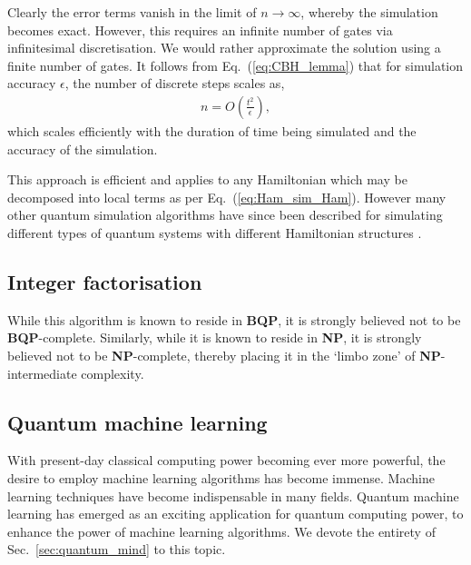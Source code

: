 Clearly the error terms vanish in the limit of \mbox{$n\to\infty$}, whereby the simulation becomes exact. However, this requires an infinite number of gates via infinitesimal discretisation. We would rather approximate the solution using a finite number of gates. It follows from Eq.~(\ref{eq:CBH_lemma}) that for simulation accuracy $\epsilon$, the number of discrete steps scales as,
\begin{align}
n = O\left(\frac{t^2}{\epsilon}\right),
\end{align}
which scales efficiently with the duration of time being simulated and the accuracy of the simulation.

This approach is efficient and applies to any Hamiltonian which may be decomposed into local terms as per Eq.~(\ref{eq:Ham_sim_Ham}). However many other quantum simulation algorithms have since been described for simulating different types of quantum systems with different Hamiltonian structures \cite{bib:JLP, bib:BrennenWavelets}.

%
%

\subsection{Integer factorisation} \label{sec:shors_alg}



While this algorithm is known to reside in \textbf{BQP}, it is strongly believed not to be \textbf{BQP}-complete. Similarly, while it is known to reside in \textbf{NP}, it is strongly believed not to be \textbf{NP}-complete, thereby placing it in the `limbo zone' of \textbf{NP}-intermediate complexity.

%
%

\subsection{Quantum machine learning} 

With present-day classical computing power becoming ever more powerful, the desire to employ machine learning algorithms has become immense. Machine learning techniques have become indispensable in many fields. Quantum machine learning has emerged as an exciting application for quantum computing power, to enhance the power of machine learning algorithms. We devote the entirety of Sec.~\ref{sec:quantum_mind} to this topic.

